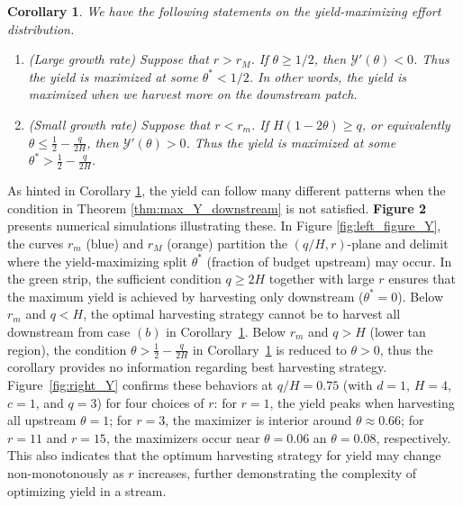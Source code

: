 \documentclass[11pt]{article}
\newtheorem{corollary}[theorem]{Corollary}
\def\YY{\mathcal{Y}}
\theoremstyle{definition}
\begin{document}
\begin{corollary}\label{cor:max_Y}
We have the following statements on the yield-maximizing effort distribution.
    \begin{enumerate}
        \item[(a)] (Large growth rate) Suppose that $r>r_M$. If $\theta\geq 1/2$, then $\YY'(\theta)<0$. Thus the yield is maximized at some $\theta^*<1/2$. In other words, the yield is maximized when we harvest more on the downstream patch.
        \item[(b)] (Small growth rate) Suppose that $r<r_m$. If $H(1-2\theta)\geq q$, or equivalently $\theta\leq\frac{1}{2}-\frac{q}{2H}$, then $\YY'(\theta)>0$. Thus the yield is maximized at some $\theta^*>\frac{1}{2}-\frac{q}{2H}$. 
    \end{enumerate}


    
\end{corollary}

As hinted in Corollary \ref{cor:max_Y}, the yield can follow many different patterns when the condition in Theorem \ref{thm:max_Y_downstream} is not satisfied. \textbf{Figure 2} presents numerical simulations illustrating these. In Figure \ref{fig:left_figure_Y}, the curves $r_m$ (blue) and $r_M$ (orange) partition the $(q/H,r)$-plane and delimit where the yield-maximizing split $\theta^\ast$ (fraction of budget upstream) may occur. In the green strip, the sufficient condition $q\ge 2H$ together with large $r$ ensures that the maximum yield is achieved by harvesting only downstream ($\theta^\ast=0$). Below $r_m$ and $q<H$, the optimal harvesting strategy cannot be to harvest all downstream from case $(b)$ in Corollary~\ref{cor:max_Y}. Below $r_m$ and $q>H$ (lower tan region), the condition $\theta>\frac{1}{2}-\frac{q}{2H}$ in Corollary~\ref{cor:max_Y} is reduced to $\theta>0$, thus the corollary provides no information regarding best harvesting strategy. Figure~\ref{fig:right_Y} confirms these behaviors at $q/H=0.75$ (with $d=1$, $H=4$, $c=1$, and $q=3$) for four choices of $r$: for $r=1$, the yield peaks when harvesting all upstream $\theta= 1$; for $r=3$, the maximizer is interior around $\theta\approx 0.66$; for $r=11$ and $r=15$, the maximizers occur near $\theta= 0.06$ an $\theta = 0.08$, respectively. This also indicates that the optimum harvesting strategy for yield may change non-monotonously as $r$ increases, further demonstrating the complexity of optimizing yield in a stream.
\end{document}
